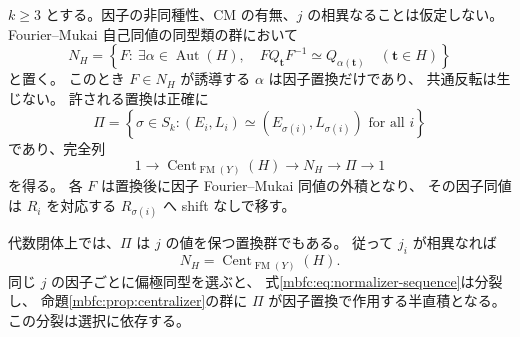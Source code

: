 \begin{proposition}
\label{mbfc:prop:normalizer}
$k\ge3$ とする。因子の非同種性、CM の有無、$j$ の相異なることは仮定しない。
Fourier--Mukai 自己同値の同型類の群において
\[
 N_H=\left\{F:\ \exists\alpha\in\operatorname{Aut}(H),\quad
 FQ_{\mathbf t}F^{-1}\simeq Q_{\alpha(\mathbf t)}\quad
 (\mathbf t\in H)\right\}
\]
と置く。
このとき $F\in N_H$ が誘導する $\alpha$ は因子置換だけであり、
共通反転は生じない。
許される置換は正確に
\[
 \Pi=\left\{\sigma\in S_k:
       (E_i,L_i)\simeq(E_{\sigma(i)},L_{\sigma(i)})\text{ for all }i\right\}
\]
であり、完全列
\begin{equation}\label{mbfc:eq:normalizer-sequence}
 1\longrightarrow\operatorname{Cent}_{\operatorname{FM}(Y)}(H)
 \longrightarrow N_H\longrightarrow\Pi\longrightarrow1
\end{equation}
を得る。
各 $F$ は置換後に因子 Fourier--Mukai 同値の外積となり、
その因子同値は $R_i$ を対応する $R_{\sigma(i)}$ へ shift なしで移す。

代数閉体上では、$\Pi$ は $j$ の値を保つ置換群でもある。
従って $j_i$ が相異なれば
\begin{equation}\label{mbfc:eq:normalizer-equals-centralizer}
 N_H=\operatorname{Cent}_{\operatorname{FM}(Y)}(H).
\end{equation}
同じ $j$ の因子ごとに偏極同型を選ぶと、
式\eqref{mbfc:eq:normalizer-sequence}は分裂し、
命題\ref{mbfc:prop:centralizer}の群に $\Pi$ が因子置換で作用する半直積となる。
この分裂は選択に依存する。
\end{proposition}
